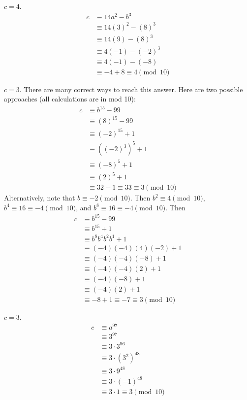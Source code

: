 \documentclass[12pt]{exam}
\begin{document}
\begin{solution}
\begin{qparts}
    \item $c=4$.
    \begin{align*}
        c &\equiv 14a^2 - b^3\\
        &\equiv 14(3)^2 - (8)^3\\
        &\equiv 14(9) - (8)^3\\
        &\equiv 4(-1) - (-2)^3\\
        &\equiv 4(-1) - (-8)\\
        &\equiv -4 + 8 \equiv 4 \pmod{10}
    \end{align*}
    
    \item $c=3$. There are many correct ways to reach this answer. Here are two possible approaches (all calculations are in mod 10):
    \begin{align*}
        c &\equiv b^{15} - 99\\
        &\equiv (8)^{15}  - 99\\
        &\equiv (-2)^{15}  + 1\\
        &\equiv ((-2)^3)^5 + 1\\
        &\equiv (-8)^5 + 1 \\
        &\equiv (2)^5 + 1 \\
        &\equiv 32 + 1 \equiv 33 \equiv 3 \pmod{10}
    \end{align*}
    Alternatively, note that $b \equiv -2 \pmod{10}$. Then $b^2 \equiv 4 \pmod{10}$, $b^4 \equiv 16 \equiv -4 \pmod{10}$, and $b^8 \equiv 16 \equiv -4 \pmod{10}$. Then
    \begin{align*}
        c &\equiv b^{15} - 99\\
        &\equiv b^{15} + 1\\
        &\equiv b^{8} b^{4} b^{2} b^{1} + 1\\
        &\equiv (-4)(-4)(4)(-2) + 1 \\
        &\equiv (-4)(-4)(-8) + 1 \\
        &\equiv (-4)(-4)(2) + 1 \\
        &\equiv (-4)(-8) + 1 \\
        &\equiv (-4)(2) + 1 \\
        &\equiv -8 + 1 \equiv -7 \equiv 3 \pmod{10}
    \end{align*}
    
    \item $c=3$.
    \begin{align*}
        c &\equiv a^{97}\\
        &\equiv 3^{97}\\
        &\equiv 3 \cdot 3^{96} \\
        &\equiv 3 \cdot (3^2)^{48} \\
        &\equiv 3 \cdot 9^{48} \\
        &\equiv 3 \cdot (-1)^{48} \\
        &\equiv 3 \cdot 1 \equiv 3\pmod{10}
    \end{align*}
\end{qparts}


\end{solution}
\end{document}
